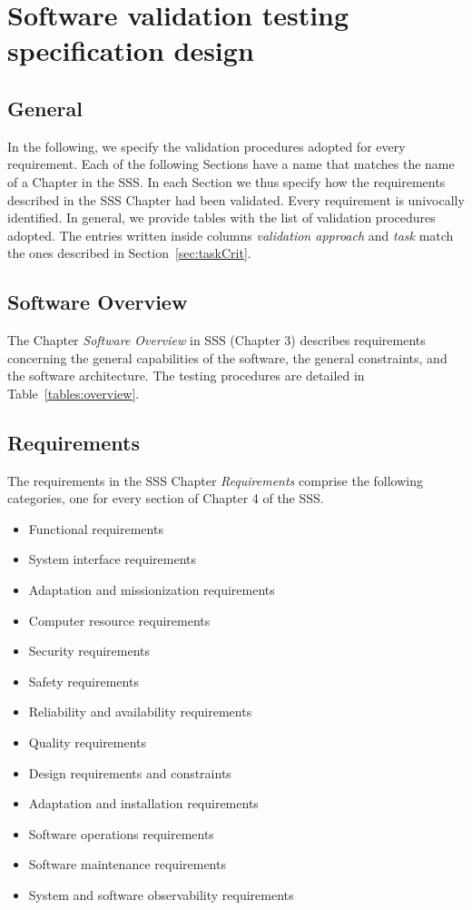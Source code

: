 \chapter{Software validation testing specification design}

\section{General}

In the following, we specify the validation procedures adopted for every requirement. Each of the following Sections have a name that matches the name of a Chapter in the SSS. In each Section we thus specify how the requirements described in the SSS Chapter had been validated.
Every requirement is univocally identified. In general, we provide tables with the list of validation procedures adopted. 
The entries written inside columns \emph{validation approach} and \emph{task} match the ones described in Section~\ref{sec:taskCrit}.

\section{Software Overview}
The Chapter \emph{Software Overview} in SSS (Chapter 3) describes requirements concerning the general capabilities of the software, the general constraints, and the software architecture.
The testing procedures are detailed in Table~\ref{tables:overview}.



\clearpage 
\section{Requirements}

The requirements in the SSS Chapter \emph{Requirements} comprise the following categories, one for every section of Chapter 4 of the SSS.

\begin{itemize}
  \item Functional requirements
  \item System interface requirements
  \item Adaptation and missionization requirements
  \item Computer resource requirements
  \item Security requirements
  \item Safety requirements
  \item Reliability and availability requirements
  \item Quality requirements
  \item Design requirements and constraints
  \item Adaptation and installation requirements
  \item Software operations requirements
  \item Software maintenance requirements
  \item System and software observability requirements
\end{itemize}

